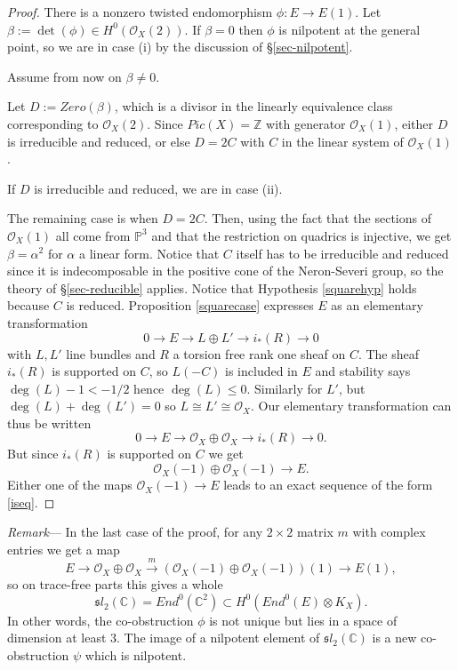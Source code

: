 \documentclass{amsart}
\theoremstyle{plain}
\numberwithin{equation}{section}
\begin{document}
\begin{proof}
There is a nonzero twisted endomorphism $\phi : E\rightarrow E(1)$.
Let $\beta := \det (\phi )\in H^0({{\mathcal O}} _X(2))$. If $\beta = 0$ then $\phi$ is 
nilpotent at the general point, so we are in case (i) by the discussion of
\S \ref{sec-nilpotent}. 

Assume from now on $\beta \neq 0$.

Let $D:= Zero (\beta )$,
which is a divisor in the linearly equivalence class corresponding  to ${{\mathcal O}} _X(2)$.
Since $Pic (X)={{\mathbb Z}}$ with generator ${{\mathcal O}} _X(1)$, either $D$ is irreducible and reduced,
or else $D=2C$ with $C$ in the linear system of ${{\mathcal O}} _X(1)$. 

If $D$ is irreducible and reduced, we are in case (ii). 

The remaining case is when $D=2C$. Then, 
using the fact that the
sections of ${{\mathcal O}} _X(1)$ all come from ${{\mathbb P}} ^3$ and that the restriction
on quadrics is injective, we get $\beta = \alpha ^2$ for $\alpha$ a linear form. 
Notice that $C$ itself has to be irreducible and reduced since it is indecomposable in
the positive cone of the Neron-Severi group, so 
the theory of \S \ref{sec-reducible} applies.
Notice that Hypothesis \ref{squarehyp} holds because $C$ is reduced. 
Proposition \ref{squarecase} expresses $E$ as an elementary
transformation
$$
0\rightarrow E \rightarrow L\oplus L' \rightarrow i_{\ast}(R)\rightarrow 0
$$
with $L,L'$ line bundles and $R$ a torsion free rank one sheaf on $C$. 
The sheaf $i_{\ast}(R)$ is supported on $C$, so $L(-C)$ is included in $E$
and stability says $\deg (L)-1 < -1/2$ hence $\deg (L)\leq 0$. Similarly
for $L'$, but $\deg (L)+\deg (L')=0$ so  $L\cong L'\cong {{\mathcal O}} _X$. 
Our elementary transformation can thus be written
$$
0\rightarrow E \rightarrow {{\mathcal O}} _X\oplus {{\mathcal O}} _X \rightarrow i_{\ast}(R)\rightarrow 0.
$$
But since $i_{\ast}(R)$ is supported on $C$ we get 
$$
{{\mathcal O}} _X(-1)\oplus {{\mathcal O}} _X(-1) \rightarrow E.
$$
Either one of the maps ${{\mathcal O}} _X(-1)\rightarrow E$ leads to an 
exact sequence of the form \eqref{iseq}. 
\end{proof}

\noindent
{\em Remark}---
In the last case of the proof,
for any $2\times 2$ matrix $m$ with complex entries we get a map
$$
E\rightarrow {{\mathcal O}} _X\oplus {{\mathcal O}} _X \stackrel{m}{\rightarrow} ({{\mathcal O}} _X(-1)\oplus {{\mathcal O}} _X(-1) )(1) \rightarrow E(1),
$$
so on trace-free parts this gives a whole
$$
{\mathfrak sl}_2({{\mathbb C}} )= End ^0({{\mathbb C}} ^2) \subset H^0(End ^0(E)\otimes K_X).
$$
In other words, the co-obstruction $\phi$ is not unique but lies in a space of
dimension at least $3$. The image of a nilpotent element of  
${\mathfrak sl}_2({{\mathbb C}} )$ is a new co-obstruction $\psi$ which is nilpotent.
\end{document}
